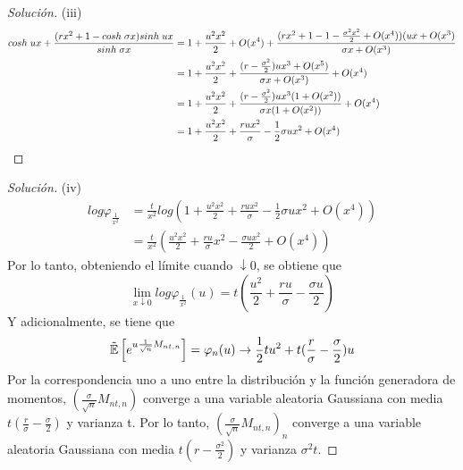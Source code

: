 \documentclass[11pt,notitlepage]{article}
\newenvironment{solucion}
  {\begin{proof}[Solución]}
  {\end{proof}}
\begin{document}
\begin{solucion}
 (iii)
 \begin{align*}
     cosh\hspace{0.1cm}ux+\frac{(rx^2+1-cosh\hspace{0.1cm}\sigma x)sinh\hspace{0.1cm}ux}{sinh\hspace{0.1cm}\sigma x}&=1+\frac{u^2x^2}{2}+O(x^4)+\frac{(rx^2+1-1-\frac{\sigma^2x^2}{2}+O(x^4))(ux+O(x^3)}{\sigma x+O(x^3)}\\
     &=1+\frac{u^2x^2}{2}+\frac{(r-\frac{\sigma^2}{2})ux^3+O(x^5)}{\sigma x+O(x^3)}+O(x^4)\\
     &=1+\frac{u^2x^2}{2}+\frac{(r-\frac{\sigma^2}{2})ux^3(1+O(x^2))}{\sigma x(1+O(x^2))}+O(x^4)\\
     &=1+\frac{u^2x^2}{2}+\frac{rux^2}{\sigma}-\frac{1}{2}\sigma ux^2+O(x^4)
 \end{align*}
\end{solucion}
\begin{solucion}
 (iv)
 \begin{align*}
     log \varphi_{\frac{1}{x^2}}&=\frac{t}{x^2}log\left( 1+\frac{u^2x^2}{2}+\frac{rux^2}{\sigma}-\frac{1}{2}\sigma ux^2+O(x^4)\right)\\
     &=\frac{t}{x^2}\left( \frac{u^2x^2}{2}+\frac{ru}{\sigma}x^2-\frac{\sigma ux^2}{2}+O(x^4)\right)
 \end{align*}
 \hspace{0.4cm} Por lo tanto, obteniendo el límite cuando $\downarrow0$, se obtiene que
 \begin{equation*}
     \lim_{x\downarrow0}log\varphi_{\frac{1}{x^2}}(u)=t\left(\frac{u^2}{2}+\frac{ru}{\sigma}-\frac{\sigma u}{2}\right)
 \end{equation*}
\hspace{0.4cm} Y adicionalmente, se tiene que
\begin{equation*}
    \Tilde{\mathbb{E}}\left[ e^{u\frac{1}{\sqrt{n}}M_{nt,n}}\right]=\varphi_{n}(u)\rightarrow\frac{1}{2}tu^{2}+t(\frac{r}{\sigma}-\frac{\sigma}{2})u
\end{equation*}
\hspace{0.4cm} Por la correspondencia uno a uno entre la distribución y la función generadora de momentos, $(\frac{\sigma}{\sqrt{n}}M_{nt,n})$ converge a una variable aleatoria Gaussiana con media $t(\frac{r}{\sigma}-\frac{\sigma}{2})$ y varianza t. Por lo tanto, $(\frac{\sigma}{\sqrt{n}}M_{nt,n})_{n}$ converge a una variable aleatoria Gaussiana con media $t(r-\frac{\sigma^2}{2})$ y varianza $\sigma^2t.$

\end{solucion}
\end{document}
